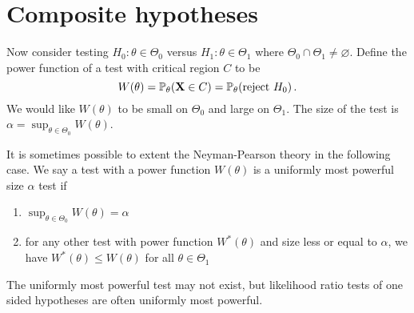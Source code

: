 \section{Composite hypotheses}
\label{sec:2.5}

Now consider testing $H_0 : \theta \in \Theta_0$ versus $H_1 : \theta \in \Theta_1$ where $\Theta_0 \cap \Theta_1 \neq \varnothing$.
Define the power function of a test with critical region $C$ to be
\[
W(\theta) = \mathbb{P}_\theta (\mathbf{X} \in C) = \mathbb{P}_\theta (\text{reject } H_0) \, {.}
\]
We would like $W(\theta)$ to be small on $\Theta_0$ and large on $\Theta_1$.
The size of the test is $\alpha = \sup_{\theta \in \Theta_0} W(\theta)$.

It is sometimes possible to extent the Neyman-Pearson theory in the following case.
We say a test with a power function $W(\theta)$ is a uniformly most powerful size $\alpha$ test if
\begin{enumerate}
\item $\sup_{\theta \in \Theta_0} W(\theta) = \alpha$
\item for any other test with power function $W^* (\theta)$ and size less or equal to $\alpha$, we have $W^*(\theta) \leq W(\theta)$ for all $\theta \in \Theta_1$
\end{enumerate}
The uniformly most powerful test may not exist, but likelihood ratio tests of one sided hypotheses are often uniformly most powerful.


